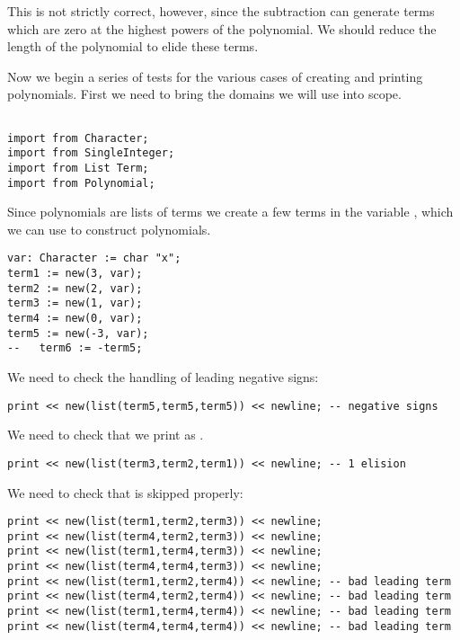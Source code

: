 This is not strictly correct, however, since the subtraction can 
generate terms which are zero at the highest powers of the polynomial.
We should reduce the length of the polynomial to elide these terms.

Now we begin a series of tests for the various cases of creating
and printing polynomials. First we need to bring the domains we
will use into scope.

\begin{small}
\begin{verbatim}

import from Character;
import from SingleInteger;
import from List Term;
import from Polynomial;
\end{verbatim}
\end{small}

Since polynomials are lists of terms we create a few terms in the
variable , which we can use to construct polynomials.

\begin{small}
\begin{verbatim}
var: Character := char "x";
term1 := new(3, var);
term2 := new(2, var);
term3 := new(1, var);
term4 := new(0, var);
term5 := new(-3, var);
--   term6 := -term5;
\end{verbatim}
\end{small}

We need to check the handling of leading negative signs:

\begin{small}
\begin{verbatim}
print << new(list(term5,term5,term5)) << newline; -- negative signs
\end{verbatim}
\end{small}

We need to check that we print  as .

\begin{small}
\begin{verbatim}
print << new(list(term3,term2,term1)) << newline; -- 1 elision
\end{verbatim}
\end{small}

We need to check that  is skipped properly:

\begin{small}
\begin{verbatim}
print << new(list(term1,term2,term3)) << newline;
print << new(list(term4,term2,term3)) << newline;
print << new(list(term1,term4,term3)) << newline;
print << new(list(term4,term4,term3)) << newline;
print << new(list(term1,term2,term4)) << newline; -- bad leading term
print << new(list(term4,term2,term4)) << newline; -- bad leading term
print << new(list(term1,term4,term4)) << newline; -- bad leading term
print << new(list(term4,term4,term4)) << newline; -- bad leading term
\end{verbatim}
\end{small}

